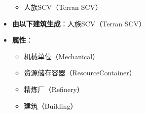 \begin{tcolorbox}[colback=white, colframe=black!60!white, title=Terran\_Refinery(), arc=0mm]
\begin{itemize}
\begin{itemize}
                \item 人族SCV（Terran SCV）
            \end{itemize}
        \item \textbf{由以下建筑生成}：人族SCV（Terran SCV）
        \item \textbf{属性}：
            \begin{itemize}
                \item 机械单位（Mechanical）
                \item 资源储存容器（ResourceContainer）
                \item 精炼厂（Refinery）
                \item 建筑（Building）
            \end{itemize}
    \end{itemize} 
\end{tcolorbox}

